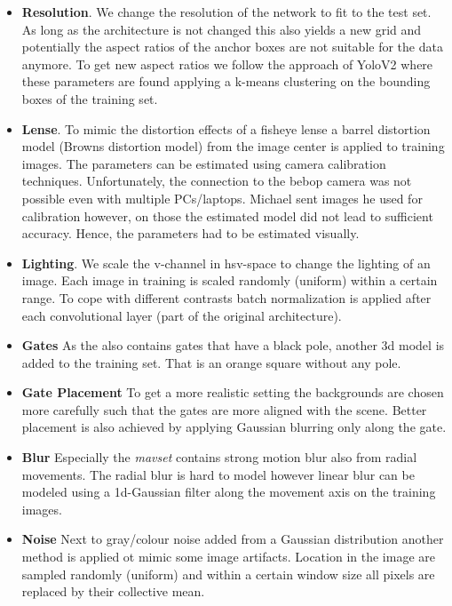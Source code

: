 \documentclass{article}
\begin{document}
\begin{itemize}
	\item \textbf{Resolution}. We change the resolution of the network to fit to the test set. As long as the architecture is not changed this also yields a new grid and potentially the aspect ratios of the anchor boxes are not suitable for the data anymore. To get new aspect ratios we follow the approach of YoloV2 where these parameters are found applying a k-means clustering on the bounding boxes of the training set.
	
	\item \textbf{Lense}. To mimic the distortion effects of a fisheye lense a barrel distortion model (Browns distortion model) from the image center is applied to training images. The parameters can be estimated using camera calibration techniques. Unfortunately, the connection to the bebop camera was not possible even with multiple PCs/laptops. Michael sent images he used for calibration however, on those the estimated model did not lead to sufficient accuracy. Hence, the parameters had to be estimated visually.
	
	\item \textbf{Lighting}. We scale the v-channel in hsv-space to change the lighting of an image. Each image in training is scaled randomly (uniform) within a certain range. To cope with different contrasts batch normalization is applied after each convolutional layer (part of the original architecture).
	
	\item \textbf{Gates} As the  also contains gates that have a black pole, another 3d model is added to the training set. That is an orange square without any pole.
	
	\item \textbf{Gate Placement} To get a more realistic setting the backgrounds are chosen more carefully such that the gates are more aligned with the scene. Better placement is also achieved by applying Gaussian blurring only along the gate.
	
	\item \textbf{Blur} Especially the \textit{mavset} contains strong motion blur also from radial movements. The radial blur is hard to model however linear blur can be modeled using a 1d-Gaussian filter along the movement axis on the training images.
	
	\item \textbf{Noise} Next to gray/colour noise added from a Gaussian distribution another method is applied ot mimic some image artifacts. Location in the image are sampled randomly (uniform) and within a certain window size all pixels are replaced by their collective mean.
	

\end{itemize}
\end{document}
